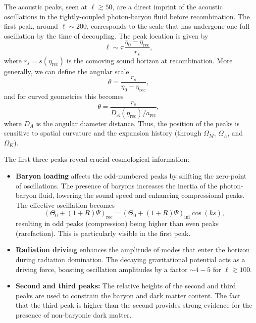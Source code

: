 \documentclass{aa}
\numberwithin{equation}{section}
\numberwithin{table}{section}
\numberwithin{figure}{section}
\begin{document}
The acoustic peaks, seen at $\ell \gtrsim 50$, are a direct imprint of the acoustic oscillations in the tightly-coupled photon-baryon fluid before recombination. The first peak, around $\ell \sim 200$, corresponds to the scale that has undergone one full oscillation by the time of decoupling. The peak location is given by
\begin{equation}
\ell \sim \pi \frac{\eta_0 - \eta_\text{rec}}{r_s},
\end{equation}
where $r_s = s(\eta_\text{rec})$ is the comoving sound horizon at recombination. More generally, we can define the angular scale
\begin{equation}
\theta = \frac{r_s}{\eta_0 - \eta_\text{rec}},
\end{equation}
and for curved geometries this becomes
\begin{equation}
\theta = \frac{r_s}{D_A(\eta_\text{rec})/a_\text{rec}},
\end{equation}
where $D_A$ is the angular diameter distance. Thus, the position of the peaks is sensitive to spatial curvature and the expansion history (through $\Omega_M$, $\Omega_\Lambda$, and $\Omega_K$).

The first three peaks reveal crucial cosmological information:
\begin{itemize}
    \item \textbf{Baryon loading} affects the odd-numbered peaks by shifting the zero-point of oscillations. The presence of baryons increases the inertia of the photon-baryon fluid, lowering the sound speed and enhancing compressional peaks. The effective oscillation becomes
    \begin{equation}
    (\Theta_0 + (1 + R)\Psi)_\text{rec} = (\Theta_0 + (1 + R)\Psi)_\text{ini} \cos(ks),
    \end{equation}
    resulting in odd peaks (compression) being higher than even peaks (rarefaction). This is particularly visible in the first peak.

    \item \textbf{Radiation driving} enhances the amplitude of modes that enter the horizon during radiation domination. The decaying gravitational potential acts as a driving force, boosting oscillation amplitudes by a factor $\sim 4-5$ for $\ell \gtrsim 100$.

    \item \textbf{Second and third peaks:} The relative heights of the second and third peaks are used to constrain the baryon and dark matter content. The fact that the third peak is higher than the second provides strong evidence for the presence of non-baryonic dark matter.
\end{itemize}
\end{document}
